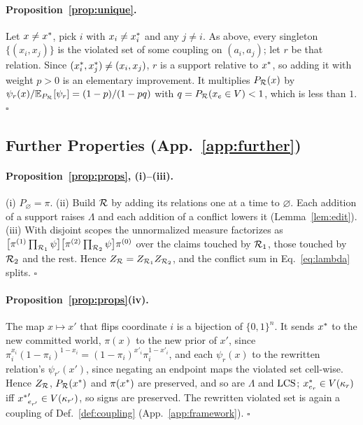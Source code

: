 \paragraph{Proposition~\ref{prop:unique}.} Let $x\ne x^{\ast}$, pick $i$ with $x_i\ne x^{\ast}_i$ and any
$j\ne i$. As above, every singleton $\{(x_i,x_j)\}$ is the violated set of some coupling on
$(a_i,a_j)$; let $r$ be that relation. Since $(x^{\ast}_i,x^{\ast}_j)\ne(x_i,x_j)$, $r$ is a support
relative to $x^{\ast}$, so adding it with weight $p>0$ is an elementary improvement. It multiplies
$P_{\mathcal{R}}(x)$ by $\psi_r(x)/\mathbb{E}_{P_{\mathcal{R}}}[\psi_r]=(1-p)/(1-pq)$ with $q=P_{\mathcal{R}}(x_e\in V)<1$, which is less
than $1$.
$\square$

\subsection{Further Properties (App.~\ref{app:further})}
\label{app:proof-props}

\paragraph{Proposition~\ref{prop:props}, (i)--(iii).} (i) $P_\varnothing=\pi$. (ii) Build $\mathcal{R}$ by adding its
relations one at a time to $\varnothing$. Each addition of a support raises $\Lambda$ and each
addition of a conflict lowers it (Lemma~\ref{lem:edit}). (iii) With disjoint scopes the
unnormalized measure factorizes as
$\bigl[\pi^{(1)}\prod_{\mathcal{R}_1}\psi\bigr]\bigl[\pi^{(2)}\prod_{\mathcal{R}_2}\psi\bigr]\pi^{(0)}$ over the
claims touched by $\mathcal{R}_1$, those touched by $\mathcal{R}_2$ and the rest. Hence $Z_{\mathcal{R}}=Z_{\mathcal{R}_1}Z_{\mathcal{R}_2}$, and
the conflict sum in Eq.~\ref{eq:lambda} splits. $\square$

\paragraph{Proposition~\ref{prop:props}(iv).} The map $x\mapsto x'$ that flips coordinate $i$ is a
bijection of $\{0,1\}^n$. It sends $x^{\ast}$ to the new committed world, $\pi(x)$ to the new prior of
$x'$, since $\pi_i^{x_i}(1-\pi_i)^{1-x_i}=(1-\pi_i)^{x'_i}\pi_i^{1-x'_i}$, and each $\psi_r(x)$ to
the rewritten relation's $\psi_{r'}(x')$, since negating an endpoint maps the violated set
cell-wise. Hence $Z_{\mathcal{R}}$, $P_{\mathcal{R}}(x^{\ast})$ and $\pi(x^{\ast})$ are preserved, and so are $\Lambda$ and $\mathrm{LCS}$;
$x^{\ast}_{e_r}\in V(\kappa_r)$ iff ${x^{\ast}}'_{e_{r'}}\in V(\kappa_{r'})$, so signs are preserved. The rewritten
violated set is again a coupling of Def.~\ref{def:coupling} (App.~\ref{app:framework}). $\square$

